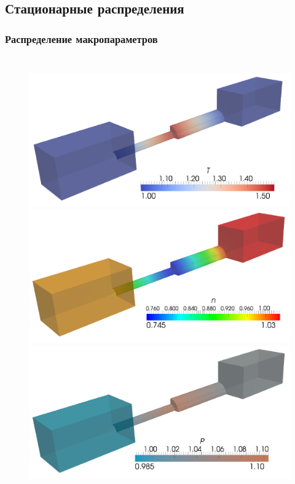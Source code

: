 \documentclass[ucs]{beamer}
\begin{document}
\subsection{Стационарные распределения}
\begin{frame}
	\frametitle{Распределение макропараметров}
	\begin{columns}[c]
	\begin{figure}
		\includegraphics[height=0.25\paperheight]{T_3D}\newline
		\includegraphics[height=0.25\paperheight]{n_3D}\newline
		\includegraphics[height=0.25\paperheight]{P_3D}\newline

\end{figure}
\end{columns}
\end{frame}
\end{document}
